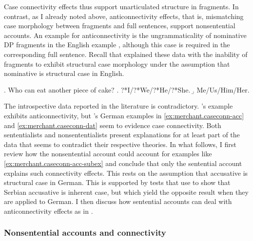 Case connectivity effects thus support unarticulated structure in fragments. In contrast, as I already noted above, anticonnectivity effects, that is, mismatching case morphology between fragments and full sentences, support nonsentential accounts. An example for anticonnectivity is the ungrammaticality of nominative DP fragments in the English example \Next, although this case is required in the corresponding full sentence. Recall that \citet{barton.progovac2005} explained these data with the inability of fragments to exhibit structural case morphology under the assumption that nominative is structural case in English.

\ex. Who can eat another piece of cake? \hfill \citep[77]{barton.progovac2005} \label{ex:barton.case-rep}
\a. ?*I/?*We/?*He/?*She.
\b. Me/Us/Him/Her.

The introspective data reported in the literature is contradictory. \citeauthor{barton.progovac2005}'s example \Last exhibits anticonnectivity, but \citeauthor{merchant2004}'s German examples in \ref{ex:merchant.caseconn-acc} and \ref{ex:merchant.caseconn-dat} seem to evidence case connectivity. Both sententialists and nonsententialists present explanations for at least part of the data that seems to contradict their respective theories. In what follows, I first review how the nonsentential account could account for examples like \ref{ex:merchant.caseconn-acc-subex} and conclude that only the sentential account explains such connectivity effects. This rests on the assumption that accusative is structural case in German. This is supported by tests that \citet{progovac2006} use to show that Serbian accusative is inherent case, but which yield the opposite result when they are applied to German. I then discuss how sentential accounts can deal with anticonnectivity effects as in \LLast. 

\subsubsection{Nonsentential accounts and connectivity}

